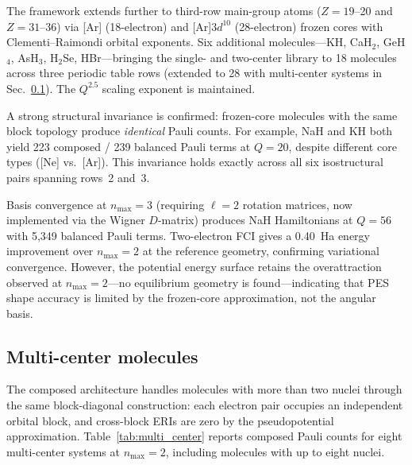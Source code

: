 \documentclass[aps,pra,twocolumn,superscriptaddress,longbibliography]{revtex4-2}
\begin{document}
The framework extends further to third-row main-group atoms
($Z = 19$--20 and $Z = 31$--36) via [Ar] (18-electron) and
[Ar]3$d^{10}$ (28-electron) frozen cores with Clementi--Raimondi
orbital exponents.  Six additional molecules---KH, CaH$_2$, GeH$_4$,
AsH$_3$, H$_2$Se, HBr---bringing the single- and two-center library
to 18 molecules across three periodic table rows (extended to
28 with multi-center systems in Sec.~\ref{sec:multi_center}).  The $Q^{2.5}$ scaling exponent
is maintained.

A strong structural invariance is confirmed: frozen-core molecules
with the same block topology produce \emph{identical} Pauli counts.
For example, NaH and KH both yield 223 composed / 239 balanced
Pauli terms at $Q = 20$, despite different core types ([Ne] vs.\ [Ar]).
This invariance holds exactly across all six isostructural pairs
spanning rows~2 and~3.

Basis convergence at $n_{\max} = 3$ (requiring $\ell = 2$ rotation
matrices, now implemented via the Wigner $D$-matrix) produces NaH
Hamiltonians at $Q = 56$ with 5{,}349 balanced Pauli terms.
Two-electron FCI gives a 0.40~Ha energy improvement over $n_{\max} = 2$
at the reference geometry, confirming variational convergence.
However, the potential energy surface retains the overattraction
observed at $n_{\max} = 2$---no equilibrium geometry is found---indicating
that PES shape accuracy is limited by the frozen-core
approximation, not the angular basis.


\subsection{Multi-center molecules}
\label{sec:multi_center}

The composed architecture handles molecules with more than two nuclei
through the same block-diagonal construction: each electron pair
occupies an independent orbital block, and cross-block ERIs are zero
by the pseudopotential approximation.  Table~\ref{tab:multi_center}
reports composed Pauli counts for eight multi-center systems at
$n_{\max} = 2$, including molecules with up to eight nuclei.
\end{document}
